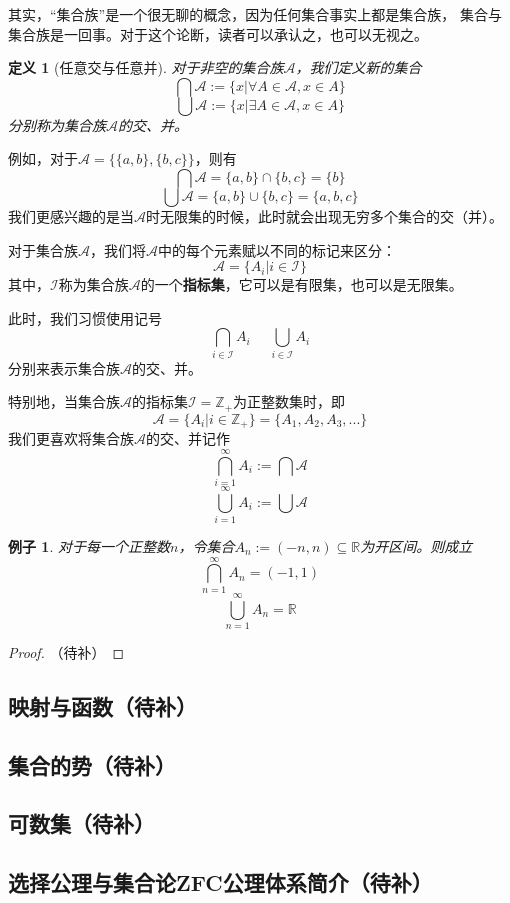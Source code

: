 \documentclass[a4paper, 11pt]{article} %
\newcommand*{\vs}{\vspace{5pt}}
\newtheorem{definition}{定义}[subsection]
\newtheorem{example}{例子}[subsection]
\begin{document}
其实，“集合族”是一个很无聊的概念，因为任何集合事实上都是集合族，
集合与集合族是一回事。对于这个论断，读者可以承认之，也可以无视之。

\begin{definition}[任意交与任意并]
对于非空的集合族$\mathcal{A}$，我们定义新的集合
$$\bigcap \mathcal{A}:=\{x|\forall A\in \mathcal{A},x\in A\}$$
$$\bigcup \mathcal{A}:=\{x|\exists A\in \mathcal{A},x\in A\}$$
分别称为集合族$\mathcal{A}$的交、并。
\end{definition}
例如，对于$\mathcal{A}=\{\{a,b\},\{b,c\}\}$，则有
$$\bigcap \mathcal{A}=\{a,b\}\cap\{b,c\}=\{b\}$$
$$\bigcup \mathcal{A}=\{a,b\}\cup\{b,c\}=\{a,b,c\}$$
我们更感兴趣的是当$\mathcal{A}$时无限集的时候，此时就会出现无穷多个集合的交（并）。\vs

对于集合族$\mathcal{A}$，我们将$\mathcal{A}$中的每个元素赋以不同的标记来区分：
$$\mathcal{A}=\{A_i|i\in\mathcal{I}\}$$
其中，$\mathcal{I}$称为集合族$\mathcal{A}$的一个\textbf{指标集}，它可以是有限集，也可以是无限集。

此时，我们习惯使用记号
$$\bigcap_{i\in\mathcal{I}}A_i\,\,\,\,\,\,\,\,\bigcup_{i\in\mathcal{I}}A_i$$
分别来表示集合族$\mathcal{A}$的交、并。

特别地，当集合族$\mathcal{A}$的指标集$\mathcal{I}=\mathbb{Z_+}$为正整数集时，即
$$\mathcal{A}=\{A_i|i\in\mathbb{Z}_+\}=\{A_1,A_2,A_3,...\}$$
我们更喜欢将集合族$\mathcal{A}$的交、并记作
$$\bigcap_{i=1}^{\infty}A_i:=\bigcap\mathcal{A}$$
$$\bigcup_{i=1}^{\infty}A_i:=\bigcup\mathcal{A}$$

\begin{example}
对于每一个正整数$n$，令集合$A_n:=(-n,n)\subseteq\mathbb{R}$为开区间。则成立
$$\bigcap_{n=1}^\infty A_n=(-1,1)$$
$$\bigcup_{n=1}^\infty A_n=\mathbb{R}$$
\end{example}
\begin{proof}
（待补）
\end{proof}

\subsection{映射与函数（待补）}
\subsection{集合的势（待补）}
\subsection{可数集（待补）}
\subsection{选择公理与集合论ZFC公理体系简介（待补）}
\end{document}

